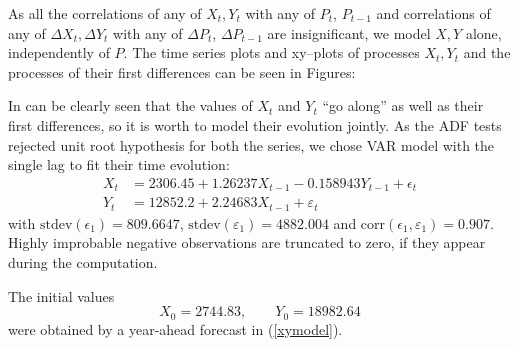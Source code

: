 \documentclass[3p,times]{elsarticle}
\begin{document}
As all the correlations of any of $X_t,Y_t$ with any of $P_t$, $P_{t-1}$  and correlations of any of $\Delta X_t,\Delta Y_t$ with any of $\Delta P_t$, $\Delta P_{t-1}$ are insignificant, we model $X,Y$ alone, independently of $P$. The time series plots and xy--plots of processes $X_t,Y_t$ and the processes of their first differences can be seen in Figures:




In can be clearly seen that the values of $X_t$ and $Y_t$ ``go along'' as well as their first differences, so it is worth to model their evolution jointly. As the ADF tests rejected unit root hypothesis for both the series, we chose VAR model with the single lag to fit their time evolution:
\begin{equation}\label{xymodel}
\begin{aligned}
X_t&=2306	.45 +   1.26237 X_{t-1}  -0.158943 Y_{t-1} + \epsilon_t \\
Y_t&=12852.2  +   2.24683  X_{t-1} + \varepsilon_t
\end{aligned}
\end{equation}
with $\mathrm{stdev}(\epsilon_1)=809.6647$, $\mathrm{stdev}(\varepsilon_1)=4882.004$ and $\mathrm{corr}(\epsilon_1,\varepsilon_1)=0.907$. Highly improbable negative observations are truncated to zero, if they appear during the computation. 

The initial values 
$$
X_0 = 2744.83,\qquad Y_0 = 18982.64
$$
were obtained by a year-ahead forecast in (\ref{xymodel}).


\end{document}
